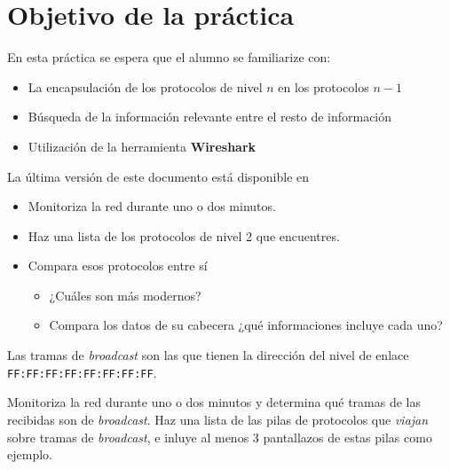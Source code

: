 

\renewcommand{\hmwkTitle}{Análisis de tráfico con \textbf{Wireshark}}

\renewcommand{\hmwkClass}{Plan. y Admin. de Redes}




\primerapagina


\section{Objetivo de la práctica}
En esta práctica se espera que el alumno se familiarize con:
\begin{itemize}
\item La encapsulación de los protocolos de nivel $n$ en los protocolos $n-1$
\item Búsqueda de la información relevante entre el resto de información
\item Utilización de la herramienta \textbf{Wireshark}
  
\end{itemize}

La última versión de este documento está disponible en 

\begin{homeworkProblem}

  \begin{itemize}
  \item Monitoriza la red durante uno o dos minutos. 
  \item Haz una lista de los protocolos de nivel 2 que encuentres.
  \item Compara esos protocolos entre sí
    \begin{itemize}
    \item ¿Cuáles son más modernos?
    \item Compara los datos de su cabecera ¿qué informaciones incluye cada uno?
    \end{itemize}
  \end{itemize}
  
\end{homeworkProblem}

\begin{homeworkProblem}

  Las tramas de \textit{broadcast} son las que tienen la dirección del nivel de enlace \texttt{FF:FF:FF:FF:FF:FF:FF:FF}.

  Monitoriza la red durante uno o dos minutos y determina qué tramas de las recibidas son de \textit{broadcast}. Haz una lista de las pilas de protocolos que \textit{viajan} sobre tramas de \textit{broadcast}, e inluye al menos 3 pantallazos de estas pilas como ejemplo.

\end{homeworkProblem}


